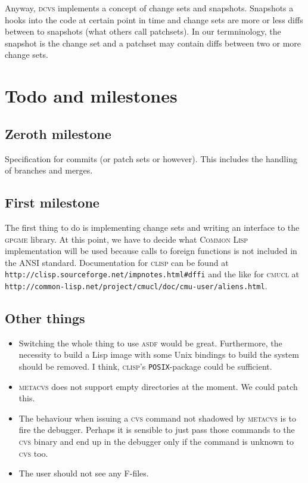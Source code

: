\documentclass[fleqn, 10pt, a4paper]{article}
\begin{document}
Anyway, \textsc{dcvs} implements a concept of change sets and snapshots.
Snapshots a hooks into the code at certain point in time and change sets
are more or less diffs between to snapshots (what others call patchsets).
In our termninology, the snapshot is the change set and a patchset may
contain diffs between two or more change sets.


\section{Todo and milestones}

\subsection{Zeroth milestone}
Specification for commits (or patch sets or however). This includes
the handling of branches and merges.

\subsection{First milestone}
The first thing to do is implementing change sets and writing an
interface to the \textsc{gpgme} library. At this point, we have to decide
what \textsc{Common Lisp} implementation will be used because calls
to foreign functions is not included in the ANSI standard.
Documentation for \textsc{clisp} can be found at
\texttt{http://clisp.sourceforge.net/impnotes.html\#dffi} and the like
for \textsc{cmucl} at \texttt{http://common-lisp.net/project/cmucl/doc/cmu-user/aliens.html}.

\subsection{Other things}
\begin{itemize}
\item Switching the whole thing to use \textsc{asdf} would be great.
Furthermore, the necessity to build a Lisp image with some Unix bindings
to build the system should be removed. I think, \textsc{clisp}'s
\texttt{POSIX}-package could be sufficient.
\item \textsc{metacvs} does not support empty directories at the moment.
We could patch this.
\item The behaviour when issuing a \textsc{cvs} command not shadowed by
\textsc{metacvs} is to fire the debugger. Perhaps it is sensible to
just pass those commands to the \textsc{cvs} binary and end up in the debugger
only if the command is unknown to \textsc{cvs} too.
\item The user should not see any F-files.
\end{itemize}
\end{document}
